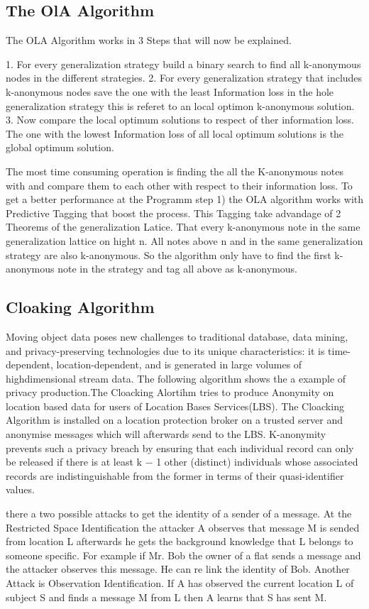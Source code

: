 \documentclass{llncs}
\begin{document}
\subsection{The OlA Algorithm }
The OLA Algorithm works in 3 Steps that will now be explained.

1.	For every generalization strategy build a binary search to find all k-anonymous nodes in the different strategies.
2.	For every generalization strategy that includes k-anonymous nodes save the one with the least Information loss in the hole generalization strategy this is referet to an local optimon k-anonymous solution.
3.	Now compare the local optimum solutions to respect of ther information loss. The one with the lowest Information loss of all local optimum solutions is  the global optimum solution.

The most time consuming operation is finding the all the K-anonymous notes with and compare them to each other with respect to their information loss.  To get a better performance at the Programm step 1) the OLA algorithm works with Predictive Tagging that boost the process.  This Tagging take advandage of 2 Theorems of the generalization Latice. That every k-anonymous note in the same generalization lattice on hight n. All notes above n and in the same generalization strategy are also k-anonymous. So the algorithm only have to find the first k-anonymous note in the strategy and tag all above as k-anonymous. 

\subsection{Cloaking Algorithm}
Moving object data poses new challenges to traditional database, data mining, and privacy-preserving technologies due to its unique characteristics: it is time-dependent, location-dependent, and is generated in large volumes of highdimensional stream data. The following algorithm shows the a example of privacy production.The Cloacking Alortihm tries to produce Anonymity on location based data for users of Location Bases Services(LBS). The Cloacking Algorithm is installed on a location protection broker on a trusted server and anonymise messages which will afterwards send to the LBS. K-anonymity prevents such a privacy breach by ensuring that each individual record can only be released if there is at least k − 1 other (distinct) individuals whose associated records are indistinguishable from the former in terms of their quasi-identifier values.

there a two possible attacks to get the identity of a sender of a message. At the  Restricted Space Identification the attacker A observes that message M is sended from location L afterwards he gets the background knowledge  that L belongs to someone specific. For example if Mr. Bob the owner of a flat sends a message and the attacker observes this message. He can re link the identity of Bob. 
Another Attack is  Observation Identiﬁcation. If A has observed the current location L of subject S and ﬁnds a message M from L then A learns that S has sent M. 
\end{document}
